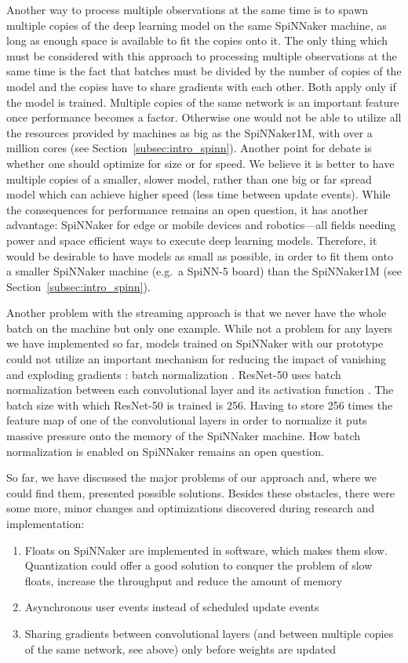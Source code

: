 \documentclass[]{article}
\begin{document}
Another way to process multiple observations at the same time is
to spawn multiple copies of the deep learning model on the same
SpiNNaker machine, as long as enough space is available to fit the
copies onto it.
The only thing which must be considered with this approach to
processing multiple observations at the same time is the
fact that batches must be divided by the number of copies of the model
and the copies have to share gradients with each other.
Both apply only if the model is trained.
Multiple copies of the same network is an important feature once
performance becomes a factor.
Otherwise one would not be able to utilize all the resources provided
by machines as big as the SpiNNaker1M, with over a million cores (see
Section~\ref{subsec:intro_spinn}).
Another point for debate is whether one should optimize for size or
for speed.
We believe it is better to have multiple copies of a smaller, slower
model, rather than one big or far spread model which can achieve
higher speed (less time between update events).
While the consequences for performance remains an open question,
it has another advantage: SpiNNaker for edge or mobile devices and
robotics---all fields needing power and space efficient ways to
execute deep learning models.
Therefore, it would be desirable to have models as small as possible,
in order to fit them onto a smaller SpiNNaker machine (e.g.\ a
SpiNN-5 board) than the SpiNNaker1M
(see Section~\ref{subsec:intro_spinn}).

Another problem with the streaming approach is that we never have the
whole batch on the machine but only one example.
While not a problem for any layers we have implemented so far,
models trained on SpiNNaker with our prototype could not utilize an
important mechanism for reducing the impact of vanishing and exploding
gradients \citep{bengio_et_al_1994, glorot_et_al_2010,
  brownlee_2019a}: batch normalization \citep{ioffe_et_al_2015}.
ResNet-50 uses batch normalization between each convolutional layer
and its activation function \citep{he_et_al_2015}.
The batch size with which ResNet-50 is trained is 256.
Having to store 256 times the feature map of one of the convolutional
layers in order to normalize it puts massive pressure onto the memory
of the SpiNNaker machine.
How batch normalization is enabled on SpiNNaker remains an open
question.

So far, we have discussed the major problems of our approach and,
where we could find them, presented possible solutions.
Besides these obstacles, there were some more, minor changes and
optimizations discovered during research and implementation:
\begin{enumerate}
  \item Floats on SpiNNaker are implemented in software, which makes
    them slow. Quantization \citep{praveen_2020} could offer a good
    solution to conquer the problem of slow floats, increase the
    throughput and reduce the amount of memory
  \item Asynchronous user events instead of scheduled update events
  \item Sharing gradients between convolutional layers (and between
    multiple copies of the same network, see above) only before
    weights are updated
\end{enumerate}
\end{document}
